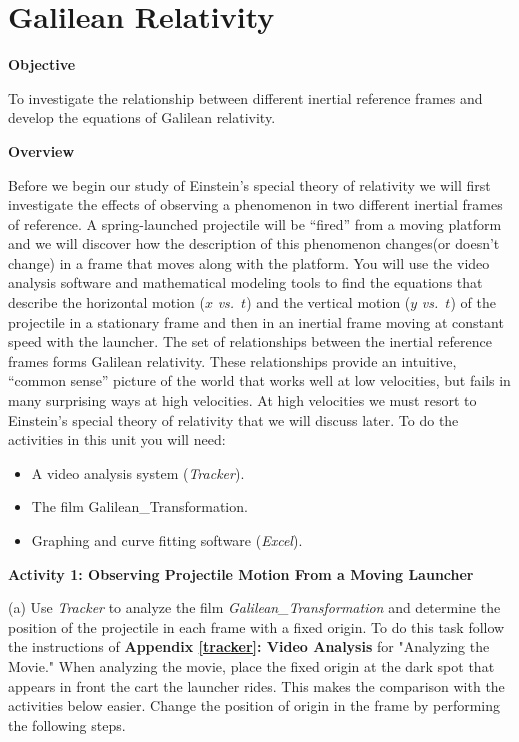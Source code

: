 
\section{Galilean Relativity}

\makelabheader %

\textbf{Objective }

To investigate the relationship between different inertial reference
frames and develop the equations of Galilean relativity.

\textbf{Overview}

Before we begin our study of Einstein's special theory of relativity
we will first investigate the effects of observing a phenomenon in
two different inertial frames of reference. A spring-launched projectile
will be {}``fired'' from a moving platform and we will discover
how the description of this phenomenon changes(or doesn't change)
in a frame that moves along with the platform. You will use the video
analysis software and mathematical modeling tools to find the equations
that describe the horizontal motion ($x$ \textit{vs.}~$t$) and the vertical motion
($y$ \textit{vs.}~$t$) of the projectile in a stationary frame and then in an inertial
frame moving at constant speed with the launcher. The set of relationships
between the inertial reference frames forms Galilean relativity. These
relationships provide an intuitive, {}``common sense'' picture of
the world that works well at low velocities, but fails in many surprising
ways at high velocities. At high velocities we must resort to Einstein's
special theory of relativity that we will discuss later. To do the
activities in this unit you will need:

\begin{itemize}
\item A video analysis system (\emph{Tracker}).
\item The film Galilean\_Transformation.
\item Graphing and curve fitting software (\emph{Excel}).
\end{itemize}
\textbf{Activity 1: Observing Projectile Motion From a Moving Launcher}

(a) Use \emph{Tracker} to analyze the film \emph{Galilean\_Transformation} and determine the position of the projectile in each frame
with a fixed origin. To do this task follow the instructions of \textbf{Appendix
\ref{tracker}: Video Analysis} for "Analyzing the Movie."
When analyzing the movie, place the fixed origin at the dark spot that appears in front the cart the launcher rides.
This makes the comparison with the activities below easier. Change
the position of origin in the frame by performing the following steps.


